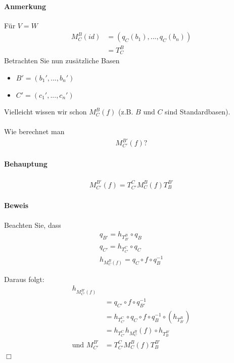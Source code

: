 \documentclass[11pt]{report}
\begin{document}
\paragraph{Anmerkung}
Für $V=W$
\begin{align}
M_{C}^{B}(id) &= (q_C(b_1), ..., q_C(b_n)) \\
 &= T_{C}^{B}
\end{align}
Betrachten Sie nun zusätzliche Basen
\begin{itemize}
 \item $B' = (b_1', ..., b_n')$
 \item $C' = (c_1', ..., c_n')$
\end{itemize}
Vielleicht wissen wir schon $M_{C}^{B}(f)$ (z.B. $B$ und $C$ sind Standardbasen).\\\\
Wie berechnet man
\begin{align}
M_{C'}^{B'}(f)?
\end{align}

\paragraph{Behauptung}
\begin{align}
M_{C'}^{B'}(f) = T_{C'}^{C} M_{C}^{B} (f) T_{B}^{B'}
\end{align}

\paragraph{Beweis}
Beachten Sie, dass
\begin{align}
q_{B'} = h_{T_{B'}^{B}} \circ q_B \\
q_{C'} = h_{T_{C'}^{C}} \circ q_C \\
h_{M_{C}^{B}(f)} = q_C \circ f \circ q_B^{-1}
\end{align}

Daraus folgt:
\begin{align}
h_{M_{C'}^{B'}(f)} & \\
&= q_{C'} \circ f \circ q_{B'}^{-1} \\
&= h_{T_{C'}^{C}} \circ q_C \circ f \circ q_{B}^{-1} \circ (h_{T_{B'}^{B}}) \\
&= h_{T_{C'}^{C}} h_{M_{C}^{B}}(f) \circ h_{T_{B}^{B'}} \\
\text{und } M_{C'}^{B'} &= T_{C'}^{C} M_{C}^{B}(f) T_{B}^{B'}
\end{align}
\hspace*{1cm} \hfill $\Box$
\end{document}
